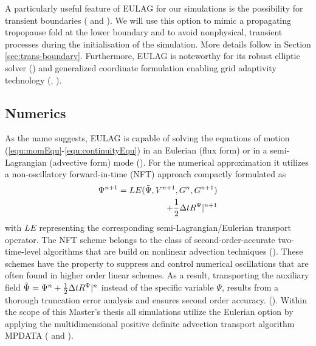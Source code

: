 A particularly useful feature of EULAG for our simulations is the possibility for transient boundaries (\cite[]{prusa_propagation_1996} and \cite{wedi_extending_2003}). We will use this option to mimic a propagating tropopause fold at the lower boundary and to avoid nonphysical, transient processes during the initialisation of the simulation. More details follow in Section \ref{sec:trans-boundary}. Furthermore, EULAG is noteworthy for its robust elliptic solver (\cite{smolarkiewicz_forward--time_1993}) and generalized coordinate formulation enabling grid adaptivity technology (\cite{prusa_eulag_2008}, \cite{kuhnlein_modelling_2012}).

\subsection*{Numerics}
As the name suggests, EULAG is capable of solving the equations of motion (\ref{equ:momEqu}-\ref{equ:continuityEqu}) in an Eulerian (flux form) or in a semi-Lagrangian (advective form) mode (\cite{smolarkiewicz_forward--time_1997}). For the numerical approximation it utilizes a non-oscillatory forward-in-time (NFT) approach compactly formulated as
\begin{equation}
\begin{aligned}
    \Psi^{n+1} = LE(\Tilde{\Psi}, V^{n+1}, G^n, G^{n+1}) \\
    + \frac{1}{2} \Delta t R^{\Psi} |^{n+1}
    \label{equ:NFTscheme}
\end{aligned}
\end{equation}
with $LE$ representing the corresponding semi-Lagrangian/Eulerian transport operator. The NFT scheme belongs to the class of second-order-accurate two-time-level algorithms that are build on nonlinear advection techniques (\cite{prusa_eulag_2008}). These schemes have the property to suppress and control numerical oscillations that are often found in higher order linear schemes. As a result, transporting the auxiliary field $\Tilde{\Psi} = \Psi^n + \frac{1}{2} \Delta t R^{\Psi}|^n$ instead of the specific variable $\Psi$, results from a thorough truncation error analysis and ensures second order accuracy. (\cite{smolarkiewicz_forward--time_1997}). Within the scope of this Master's thesis all simulations utilize the Eulerian option by applying the multidimensional positive definite advection transport algorithm MPDATA (\cite{smolarkiewicz_mpdata_1998} and \cite{smolarkiewicz_multidimensional_2006}).


